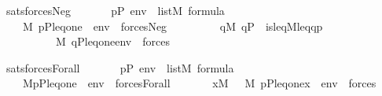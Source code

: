 \begin{isabelle}
\isamarkupfalse%
\ sats{\isacharunderscore}forces{\isacharunderscore}Neg{\isacharcolon}\isanewline
\ \ \isanewline
\ \ \ \ {\isachardoublequoteopen}p{\isasymin}P{\isachardoublequoteclose}\ {\isachardoublequoteopen}env\ {\isasymin}\ list{\isacharparenleft}M{\isacharparenright}{\isachardoublequoteclose}\ {\isachardoublequoteopen}{\isasymphi}{\isasymin}formula{\isachardoublequoteclose}\isanewline
\ \ \isanewline
\ \ \ \ {\isachardoublequoteopen}M{\isacharcomma}\ {\isacharbrackleft}p{\isacharcomma}P{\isacharcomma}leq{\isacharcomma}one{\isacharbrackright}\ {\isacharat}\ env\ {\isasymTurnstile}\ forces{\isacharparenleft}Neg{\isacharparenleft}{\isasymphi}{\isacharparenright}{\isacharparenright}\ \ \ {\isasymlongleftrightarrow}\ \isanewline
\ \ \ \ \ {\isasymnot}{\isacharparenleft}{\isasymexists}q{\isasymin}M{\isachardot}\ q{\isasymin}P\ {\isasymand}\ is{\isacharunderscore}leq{\isacharparenleft}{\isacharhash}{\isacharhash}M{\isacharcomma}leq{\isacharcomma}q{\isacharcomma}p{\isacharparenright}\ {\isasymand}\ \isanewline
\ \ \ \ \ \ \ \ \ \ M{\isacharcomma}\ {\isacharbrackleft}q{\isacharcomma}P{\isacharcomma}leq{\isacharcomma}one{\isacharbrackright}{\isacharat}env\ {\isasymTurnstile}\ forces{\isacharparenleft}{\isasymphi}{\isacharparenright}{\isacharparenright}{\isachardoublequoteclose}\isanewline

\isamarkupfalse%
\ sats{\isacharunderscore}forces{\isacharunderscore}Forall{\isacharcolon}\isanewline
\ \ \isanewline
\ \ \ \ {\isachardoublequoteopen}p{\isasymin}P{\isachardoublequoteclose}\ {\isachardoublequoteopen}env\ {\isasymin}\ list{\isacharparenleft}M{\isacharparenright}{\isachardoublequoteclose}\ {\isachardoublequoteopen}{\isasymphi}{\isasymin}formula{\isachardoublequoteclose}\isanewline
\ \ \isanewline
\ \ \ \ {\isachardoublequoteopen}M{\isacharcomma}{\isacharbrackleft}p{\isacharcomma}P{\isacharcomma}leq{\isacharcomma}one{\isacharbrackright}\ {\isacharat}\ env\ {\isasymTurnstile}\ forces{\isacharparenleft}Forall{\isacharparenleft}{\isasymphi}{\isacharparenright}{\isacharparenright}\ {\isasymlongleftrightarrow}\ \isanewline
\ \ \ \ \ {\isacharparenleft}{\isasymforall}x{\isasymin}M{\isachardot}\ \ \ M{\isacharcomma}\ {\isacharbrackleft}p{\isacharcomma}P{\isacharcomma}leq{\isacharcomma}one{\isacharcomma}x{\isacharbrackright}\ {\isacharat}\ env\ {\isasymTurnstile}\ forces{\isacharparenleft}{\isasymphi}{\isacharparenright}{\isacharparenright}{\isachardoublequoteclose}
\end{isabelle}

